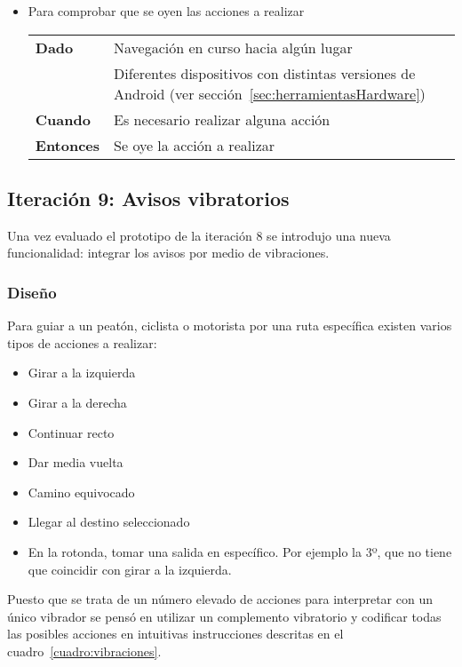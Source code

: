 \begin{itemize}
  \item Para comprobar que se oyen las acciones a realizar

  \begin{tabular}{p{}p{}}
    \hline
    \textbf{Dado}     & Navegación en curso hacia algún lugar \\
                      & Diferentes dispositivos con distintas versiones de Android (ver
                        sección~\ref{sec:herramientasHardware}) \\
    \textbf{Cuando}   & Es necesario realizar alguna acción \\
    \textbf{Entonces} & Se oye la acción a realizar \\
    \hline
  \end{tabular}
\end{itemize}

\subsection{Iteración 9: Avisos vibratorios}

Una vez evaluado el prototipo de la iteración 8 se introdujo una nueva funcionalidad: integrar los
avisos por medio de vibraciones.

\subsubsection{Diseño}

Para guiar a un peatón, ciclista o motorista por una ruta específica existen varios tipos de
acciones a realizar:

\begin{itemize}
  \item Girar a la izquierda
  \item Girar a la derecha
  \item Continuar recto
  \item Dar media vuelta
  \item Camino equivocado
  \item Llegar al destino seleccionado
  \item En la rotonda, tomar una salida en específico. Por ejemplo la 3º, que no tiene que coincidir
    con girar a la izquierda.
\end{itemize}

Puesto que se trata de un número elevado de acciones para interpretar con un único vibrador se pensó
en utilizar un complemento vibratorio y codificar todas las posibles acciones en intuitivas
instrucciones descritas en el cuadro~\ref{cuadro:vibraciones}.

